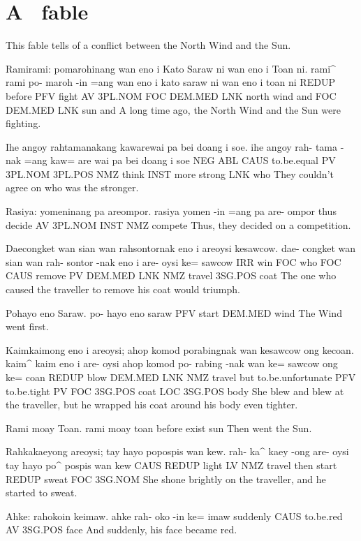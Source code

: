 \chapter{A \langname~fable}
This fable tells of a conflict between the North Wind and the Sun.
\begin{examples}
	\ex
	\script Ramirami: pomarohinang wan eno i Kato Saraw ni wan eno i Toan ni.
	\bits rami^ rami po- maroh -in =ang wan eno i kato saraw ni wan eno i toan ni
	\gloss REDUP before PFV fight AV 3PL.NOM FOC DEM.MED LNK north wind and FOC DEM.MED LNK sun and
	\tr A long time ago, the North Wind and the Sun were fighting.

	\ex
	\script Ihe angoy rahtamanakang kawarewai pa bei doang i soe.
	\bits ihe angoy rah- tama -nak =ang kaw= are wai pa bei doang i soe
	\gloss NEG ABL CAUS to.be.equal PV 3PL.NOM 3PL.POS NMZ think INST more strong LNK who
	\tr They couldn't agree on who was the stronger.

	\ex
	\script Rasiya: yomeninang pa areompor.
	\bits rasiya yomen -in =ang pa are- ompor
	\gloss thus decide AV 3PL.NOM INST NMZ compete
	\tr Thus, they decided on a competition.

	\ex
	\script Daecongket wan sian wan rahsontornak eno i areoysi kesawcow.
	\bits dae- congket wan sian wan rah- sontor -nak eno i are- oysi ke= sawcow
	\gloss IRR win FOC who FOC CAUS remove PV DEM.MED LNK NMZ travel 3SG.POS coat
	\tr The one who caused the traveller to remove his coat would triumph.

	\ex
	\script Pohayo eno Saraw.
	\bits po- hayo eno saraw
	\gloss PFV start DEM.MED wind
	\tr The Wind went first.

	\ex
	\script Kaimkaimong eno i areoysi; ahop komod porabingnak wan kesawcow ong kecoan.
	\bits kaim^ kaim eno i are- oysi ahop komod po- rabing -nak wan ke= sawcow ong ke= coan
	\gloss REDUP blow DEM.MED LNK NMZ travel but to.be.unfortunate PFV to.be.tight PV FOC 3SG.POS coat LOC 3SG.POS body
	\tr She blew and blew at the traveller, but he wrapped his coat around his body even tighter.

	\ex
	\script Rami moay Toan.
	\bits rami moay toan
	\gloss before exist sun
	\tr Then went the Sun.

	\ex
	\script Rahkakaeyong areoysi; tay hayo popospis wan kew.
	\bits rah- ka^ kaey -ong are- oysi tay hayo po^ pospis wan kew
	\gloss CAUS REDUP light LV NMZ travel then start REDUP sweat FOC 3SG.NOM
	\tr She shone brightly on the traveller, and he started to sweat.

	\ex
	\script Ahke: rahokoin keimaw.
	\bits ahke rah- oko -in ke= imaw
	\gloss suddenly CAUS to.be.red AV 3SG.POS face
	\tr And suddenly, his face became red.
\end{examples}